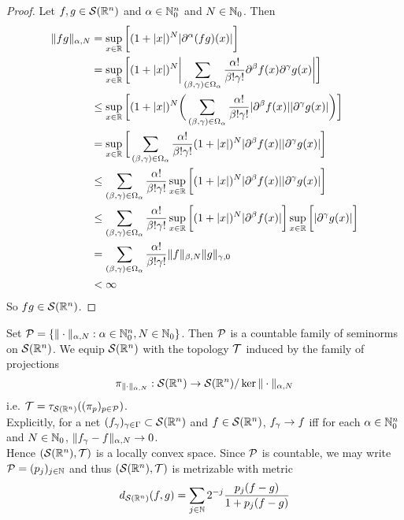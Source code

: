 \documentclass{book}
\begin{document}
	\begin{proof}
		Let $f,g \in \mathcal{S}(\mathbb{R}^n)$ and $\alpha \in \mathbb{N}_0^n$ and $N \in  \mathbb{N}_0$. Then 
		\begin{align*}
			\|fg\|_{\alpha, N}
			& = \sup_{x \in \mathbb{R}} \bigg[ (1 + |x|)^N|\partial^{\alpha}(fg)(x)| \bigg] \\
			& = \sup_{x \in \mathbb{R}} \bigg[ (1 + |x|)^N \bigg | \sum\limits_{(\beta, \gamma) \in \Omega_{\alpha}} \frac{\alpha!}{\beta! \gamma!}\partial^{\beta}f (x) \partial^{\gamma}g (x) \bigg|  \bigg] \\
			& \leq \sup_{x \in \mathbb{R}} \bigg[ (1 + |x|)^N \bigg(\sum\limits_{(\beta, \gamma) \in \Omega_{\alpha}} \frac{\alpha!}{\beta! \gamma!}|\partial^{\beta}f (x)| |\partial^{\gamma}g (x)| \bigg) \bigg] \\
			& = \sup_{x \in \mathbb{R}} \bigg[   \sum\limits_{(\beta, \gamma) \in \Omega_{\alpha}} \frac{\alpha!}{\beta! \gamma!} (1 + |x|)^N|\partial^{\beta}f(x)| |\partial^{\gamma}g (x)| \bigg] \\
			& \leq \sum\limits_{(\beta, \gamma) \in \Omega_{\alpha}} \frac{\alpha!}{\beta! \gamma!} \sup_{x \in \mathbb{R}} \bigg[ (1 + |x|)^N|\partial^{\beta}f(x)| |\partial^{\gamma}g (x)| \bigg] \\
			& \leq \sum\limits_{(\beta, \gamma) \in \Omega_{\alpha}} \frac{\alpha!}{\beta! \gamma!} \sup_{x \in \mathbb{R}} \bigg[ (1 + |x|)^N|\partial^{\beta}f(x)| \bigg]  \sup_{x \in \mathbb{R}} \bigg[|\partial^{\gamma}g (x) | \bigg] \\
			& = \sum\limits_{(\beta, \gamma) \in \Omega_{\alpha}} \frac{\alpha!}{\beta! \gamma!}  \|f\|_{\beta, N} \|g\|_{\gamma, 0} \\
			& < \infty
		\end{align*} 
		So $fg \in \mathcal{S}(\mathbb{R}^n)$.
	\end{proof}

	\begin{defn} 
		Set $\mathcal{P} = \{\|\cdot\|_{\alpha, N}: \alpha \in \mathbb{N}_0^n, N \in \mathbb{N}_0 \}$. Then $\mathcal{P}$ is a countable family of seminorms on $\mathcal{S}(\mathbb{R}^n)$. We equip $\mathcal{S}(\mathbb{R}^n)$ with the topology $\mathcal{T}$ induced by the family of projections $$\pi_{\| \cdot \|_{\alpha,N}}: \mathcal{S}(\mathbb{R}^n) \rightarrow \mathcal{S}(\mathbb{R}^n) / \ker \|\cdot\|_{\alpha,N} $$ 
		i.e. $\mathcal{T} = \tau_{\mathcal{S}(\mathbb{R}^n)}((\pi_{p})_{p \in \mathcal{P}})$.  \\
		Explicitly, for a net $(f_{\gamma})_{\gamma \in \Gamma} \subset \mathcal{S}(\mathbb{R}^n)$ and $f \in \mathcal{S}(\mathbb{R}^n)$, $f_{\gamma} \rightarrow f$ iff for each $\alpha \in \mathbb{N}_0^n$ and $N \in  \mathbb{N}_0$, $\|f_{\gamma} - f\|_{\alpha, N} \rightarrow 0$. \\
		Hence $(\mathcal{S}(\mathbb{R}^n), \mathcal{T})$ is a locally convex space. Since $\mathcal{P}$ is countable, we may write $\mathcal{P} = (p_j)_{j \in \mathbb{N}}$ and thus $(\mathcal{S}(\mathbb{R}^n), \mathcal{T})$ is metrizable with metric
		$$d_{\mathcal{S}(\mathbb{R}^n)}(f,g) = \sum_{j \in \mathbb{N}} 2^{-j} \frac{p_j(f-g)}{1 + p_j(f-g)}$$
	\end{defn}
\end{document}
